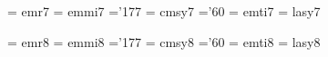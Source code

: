 \font\sevrm  = emr7               %
 \font\sevmi  = emmi7              %
    \skewchar\sevmi ='177          %
 \font\sevsy  = cmsy7              %
    \skewchar\sevsy ='60           %
 \font\sevit  = emti7              %
 \font\sevly  = lasy7             %
 
 \font\egtrm  = emr8               %
 \font\egtmi  = emmi8              %
    \skewchar\egtmi ='177          %
 \font\egtsy  = cmsy8              %
    \skewchar\egtsy ='60           %
 \font\egtit  = emti8              %
 \font\egtly  = lasy8             %
 
